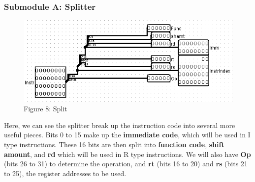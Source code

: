 \documentclass{article}
\begin{document}
\subsubsection{Submodule A: Splitter}
\begin{figure}
\vspace{-1.3cm}
\begin{center}
\includegraphics[scale=0.6]{Split.png} \\
Figure 8: Split
\end{center}
\end{figure}
Here, we can see the splitter break up the instruction code into several more useful pieces. Bits 0 to 15 make up the \textbf{immediate code}, which will be used in I type instructions. These 16 bits are then split into \textbf{function code}, \textbf{shift amount}, and \textbf{rd} which will be used in R type instructions. We will also have \textbf{Op} (bits 26 to 31) to determine the operation, and \textbf{rt} (bits 16 to 20) and \textbf{rs} (bits 21 to 25), the register addresses to be used.
\end{document}
